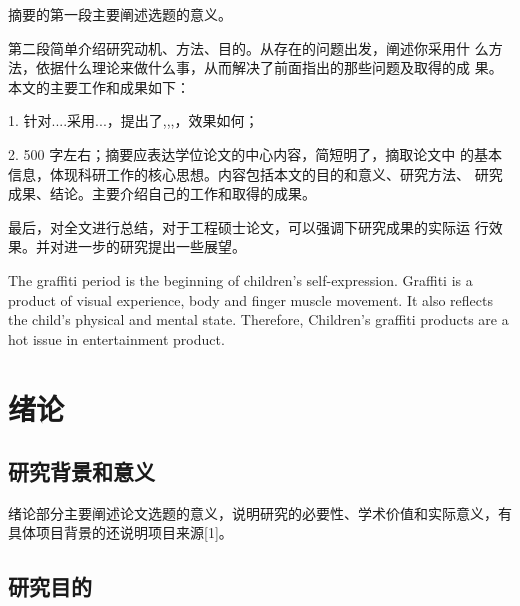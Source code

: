 \documentclass[12pt]{zjutthesis}
\begin{document}
\zjutpreface
\frontmatter
{} %
\setcounter{page}{2}
\begin{AbstractCn}
  摘要的第一段主要阐述选题的意义。

  第二段简单介绍研究动机、方法、目的。从存在的问题出发，阐述你采用什
  么方法，依据什么理论来做什么事，从而解决了前面指出的那些问题及取得的成
  果。本文的主要工作和成果如下：

  1. 针对....采用...，提出了,,,，效果如何；

  2. 500 字左右；摘要应表达学位论文的中心内容，简短明了，摘取论文中
  的基本信息，体现科研工作的核心思想。内容包括本文的目的和意义、研究方法、
  研究成果、结论。主要介绍自己的工作和取得的成果。

  最后，对全文进行总结，对于工程硕士论文，可以强调下研究成果的实际运
  行效果。并对进一步的研究提出一些展望。

\end{AbstractCn}


\begin{AbstractEn}
  The graffiti period is the beginning of children's self-expression. Graffiti is a
  product of visual experience, body and finger muscle movement. It also reflects the
  child's physical and mental state. Therefore, Children's graffiti products are a hot issue
  in entertainment product.

\end{AbstractEn}


\tableofcontents
\clearpage
\listoffigures
\listoffigureEng
\clearpage
\listoftables
\listoftableEng


\mainmatter
\chapter{绪论}
\section{研究背景和意义}
绪论部分主要阐述论文选题的意义，说明研究的必要性、学术价值和实际意义，有具体项目背景的还说明项目来源[1]。
\section{研究目的}
\end{document}
